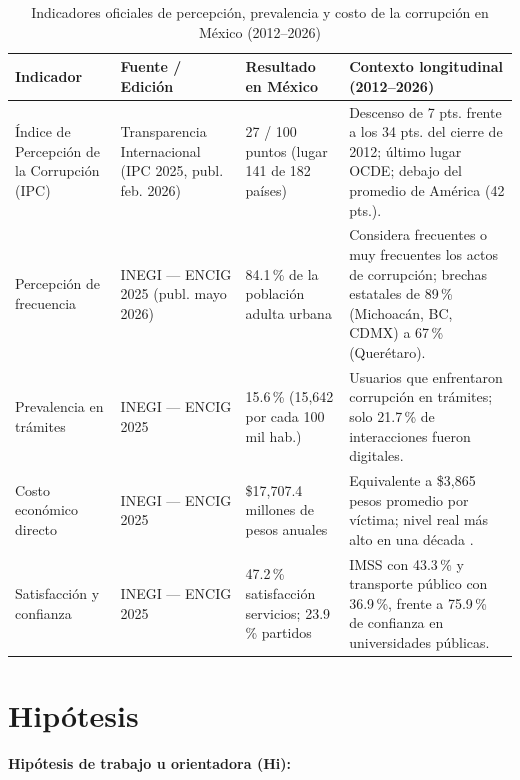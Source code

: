 \documentclass[12pt,letterpaper,oneside]{article}
\begin{document}
\begin{table}[H]
\centering
\caption{Indicadores oficiales de percepción, prevalencia y costo de la corrupción en México (2012--2026)}
\label{tab:indicadores}
\small
\begin{tabular}{@{}p{2.8cm}p{2.5cm}p{3.5cm}p{4cm}@{}}
\toprule
\textbf{Indicador} & \textbf{Fuente / Edición} & \textbf{Resultado en México} & \textbf{Contexto longitudinal (2012--2026)} \\
\midrule
Índice de Percepción de la Corrupción (IPC) & Transparencia Internacional (IPC 2025, publ. feb. 2026) & 27 / 100 puntos (lugar 141 de 182 países) & Descenso de 7 pts. frente a los 34 pts. del cierre de 2012; último lugar OCDE; debajo del promedio de América (42 pts.). \\
\addlinespace
Percepción de frecuencia & INEGI --- ENCIG 2025 (publ. mayo 2026) & 84.1\,\% de la población adulta urbana & Considera frecuentes o muy frecuentes los actos de corrupción; brechas estatales de 89\,\% (Michoacán, BC, CDMX) a 67\,\% (Querétaro). \\
\addlinespace
Prevalencia en trámites & INEGI --- ENCIG 2025 & 15.6\,\% (15,642 por cada 100 mil hab.) & Usuarios que enfrentaron corrupción en trámites; solo 21.7\,\% de interacciones fueron digitales. \\
\addlinespace
Costo económico directo & INEGI --- ENCIG 2025 & \$17,707.4 millones de pesos anuales & Equivalente a \$3,865 pesos promedio por víctima; nivel real más alto en una década \citep{imco2026}. \\
\addlinespace
Satisfacción y confianza & INEGI --- ENCIG 2025 & 47.2\,\% satisfacción servicios; 23.9\,\% partidos & IMSS con 43.3\,\% y transporte público con 36.9\,\%, frente a 75.9\,\% de confianza en universidades públicas. \\
\bottomrule
\end{tabular}
\end{table}

\clearpage


\section{Hipótesis}

\textbf{Hipótesis de trabajo u orientadora (Hi):}
\end{document}
